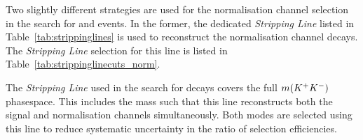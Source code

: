 

Two slightly different strategies are used for the normalisation channel selection in the search for \decay{\Bp}{\Dsp\phiz} and \decay{\Bp}{\Dsp\Kp\Km} events.
In the former, the dedicated \decay{\Bp}{\Dsp\Dzb} \emph{Stripping Line} listed in Table~\ref{tab:strippinglines} is used to reconstruct the normalisation channel decays.
The \emph{Stripping Line} selection for this line is listed in Table~\ref{tab:strippinglinecuts_norm}.

The \emph{Stripping Line} used in the search for \decay{\Bp}{\Dsp\Kp\Km} decays covers the full $m({{K}^+}{{K}^-})$ phasespace. This includes the \Dzb mass such that this line reconstructs both the signal and normalisation channels simultaneously. 
Both modes are selected using this line to reduce systematic uncertainty in the ratio of selection efficiencies.

